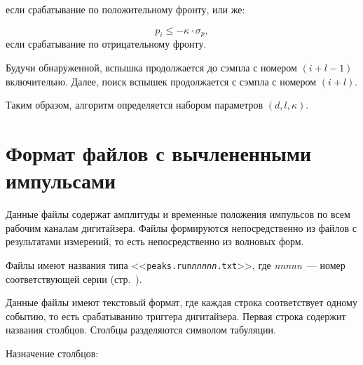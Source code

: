 \documentclass[12pt, a4paper, oneside, onecolumn]{book}
\newcommand{\FILE}[1]{<<{\tt #1}>>}
\begin{document}
\noindent если срабатывание по положительному фронту, или же:

\begin{equation}
p_i \le -\kappa \cdot \sigma_p,
\end{equation}
\noindent если срабатывание по отрицательному фронту.

Будучи обнаруженной, вспышка продолжается до сэмпла с номером $(i + l - 1)$ включительно. Далее, поиск вспышек продолжается с сэмпла с номером $(i + l)$.

Таким образом, алгоритм определяется набором параметров $(d, l, \kappa)$.


\chapter{Формат файлов с вычлененными импульсами}
\label{sec_peaks_file_format}

\newcommand{\COLUMN}[1]{{\tt #1}}

Данные файлы содержат амплитуды и временные положения импульсов по всем рабочим каналам дигитайзера. Файлы формируются непосредственно из файлов с результатами измерений, то есть непосредственно из волновых форм.

Файлы имеют названия типа \FILE{peaks.run{\it nnnnn}.txt}, где {\it nnnnn}~--- номер соответствующей серии (стр.~\pageref{sec-midas-run}).

Данные файлы имеют текстовый формат, где каждая строка соответствует одному событию, то есть срабатыванию триггера дигитайзера. Первая строка содержит названия столбцов. Столбцы разделяются символом табуляции.

Назначение столбцов:
\end{document}
